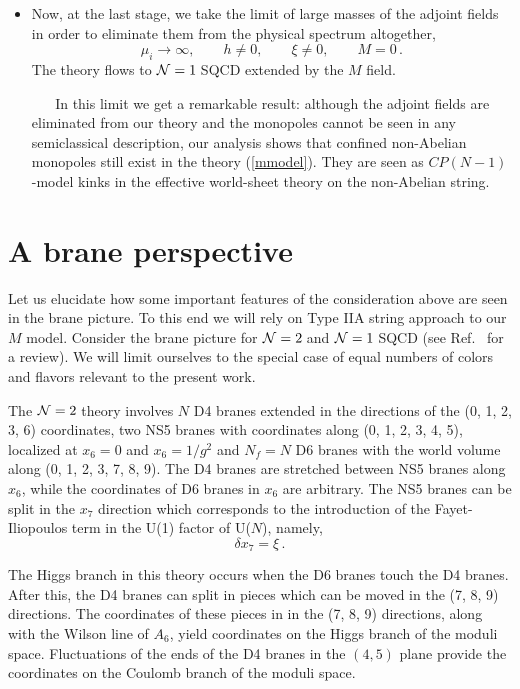 \documentclass[epsfig,12pt]{article}
\def\beq{\begin{equation}}
\def\eeq{\end{equation}}
\newcommand{\ntwo}{${\cal N}=2\;$}
\newcommand{\none}{${\cal N}=1\;$}
\begin{document}
\begin{itemize}
\item
Now, at the last stage,  we take the limit of large masses of the adjoint fields
in order to eliminate them from the physical spectrum altogether,
\beq
\mu_i\to \infty,\qquad h\neq 0, \qquad \xi\neq 0, \qquad M = 0\, .
\label{stage5}
\eeq
The theory flows to \none SQCD extended by the  $M$ field.

\mbox{} \,\,\,\,\,\,\,\,
In this limit we get a remarkable result: although the adjoint fields 
are eliminated from our theory
and the monopoles cannot be seen in any semiclassical description,
our analysis shows
that confined non-Abelian monopoles still exist in the theory (\ref{mmodel}). They are seen
as $CP(N-1)$-model kinks in the effective world-sheet theory on the non-Abelian string.

\end{itemize}

\section {A brane perspective}
\label{bpersp}

Let us elucidate how some important features
of the consideration above are seen in the
brane picture.  To this end we will rely on Type IIA string
approach to our $M$ model. Consider  the brane
picture for \ntwo and \none SQCD (see Ref.~\cite{giveon} for a review).
We will limit ourselves to the special case of equal numbers of
colors and flavors relevant to the present work.

The \ntwo theory involves $N$ D4 branes extended in the directions of the 
(0, 1, 2, 3, 6)
coordinates, two NS5 branes with coordinates along (0, 1, 2, 3, 4, 5),
localized at $x_6=0$ and $x_6=1/g^2$ and $N_f = N$ D6 branes
with the world volume along (0, 1, 2, 3, 7, 8, 9). The D4 branes
are stretched between NS5 branes along $x_6$, while
the coordinates of D6 branes in $x_6$ are arbitrary.
The NS5 branes can be split  in the $x_7$ direction which
corresponds to the introduction of the Fayet-Iliopoulos  term in the U(1)
factor of  U($N$),  namely, $$\delta x_7=\xi\,.$$

The Higgs branch
in this theory   occurs when the  D6 branes touch the
D4 branes. After this, the D4 branes can split 
in pieces which can be moved in the (7, 8, 9) directions.
The coordinates of these pieces in in the (7, 8, 9) directions,  along with the
Wilson line of $A_6$,  yield coordinates on the
Higgs branch of the moduli space.  Fluctuations
of the ends of the D4 branes in the $(4,5)$ plane provide
the coordinates on the Coulomb branch of the moduli space.
\end{document}

